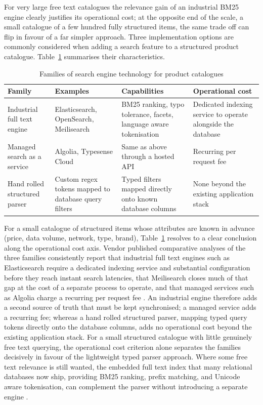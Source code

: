 For very large free text catalogues the relevance gain of an industrial BM25 engine clearly justifies its operational cost; at the opposite end of the scale, a small catalogue of a few hundred fully structured items, the same trade off can flip in favour of a far simpler approach. Three implementation options are commonly considered when adding a search feature to a structured product catalogue. Table~\ref{tab:search-families} summarises their characteristics.

\begin{table}[H]
  \caption{Families of search engine technology for product catalogues}
  \label{tab:search-families}
  \centering\small
  \begin{tabular}{|p{3.2cm}|p{3.0cm}|p{3.4cm}|p{3.6cm}|}
    \hline
    \textbf{Family} & \textbf{Examples} & \textbf{Capabilities} & \textbf{Operational cost} \\
    \hline
    Industrial full text engine & Elasticsearch, OpenSearch, Meilisearch & BM25 ranking, typo tolerance, facets, language aware tokenisation & Dedicated indexing service to operate alongside the database \\
    \hline
    Managed search as a service & Algolia, Typesense Cloud & Same as above through a hosted API & Recurring per request fee \\
    \hline
    Hand rolled structured parser & Custom regex tokens mapped to database query filters & Typed filters mapped directly onto known database columns & None beyond the existing application stack \\
    \hline
  \end{tabular}
\end{table}

For a small catalogue of structured items whose attributes are known in advance (price, data volume, network, type, brand), Table~\ref{tab:search-families} resolves to a clear conclusion along the operational cost axis. Vendor published comparative analyses of the three families consistently report that industrial full text engines such as Elasticsearch require a dedicated indexing service and substantial configuration before they reach instant search latencies, that Meilisearch closes much of that gap at the cost of a separate process to operate, and that managed services such as Algolia charge a recurring per request fee \parencite{MeilisearchComparison2025}. An industrial engine therefore adds a second source of truth that must be kept synchronised; a managed service adds a recurring fee; whereas a hand rolled structured parser, mapping typed query tokens directly onto the database columns, adds no operational cost beyond the existing application stack. For a small structured catalogue with little genuinely free text querying, the operational cost criterion alone separates the families decisively in favour of the lightweight typed parser approach. Where some free text relevance is still wanted, the embedded full text index that many relational databases now ship, providing BM25 ranking, prefix matching, and Unicode aware tokenisation, can complement the parser without introducing a separate engine \parencite{SQLiteFTS5}.


